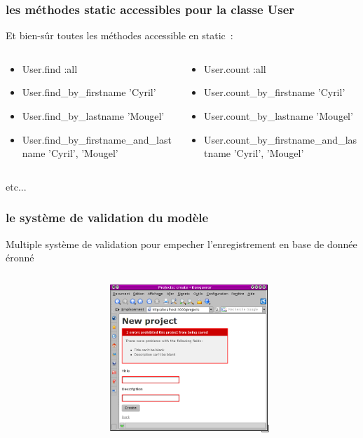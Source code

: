 \documentclass{beamer}
\begin{document}
\begin{frame}
    \frametitle{les méthodes static accessibles pour la classe User}
    Et bien-sûr toutes les méthodes accessible en static~:
    \tiny{}
    \begin{columns}
        \begin{column}[l]{6cm}
            \begin{itemize}
                \item User.find :all
                \item User.find\_by\_firstname 'Cyril'
                \item User.find\_by\_lastname 'Mougel'
                \item User.find\_by\_firstname\_and\_lastname 'Cyril', 'Mougel'
            \end{itemize}
        \end{column}

        \begin{column}[r]{6cm}
            \begin{itemize}
                \item User.count :all
                \item User.count\_by\_firstname 'Cyril'
                \item User.count\_by\_lastname 'Mougel'
                \item User.count\_by\_firstname\_and\_lastname 'Cyril', 'Mougel'
            \end{itemize}
        \end{column}
    \end{columns}
    \normalsize{}
    etc...
\end{frame}

\begin{frame}
    \frametitle{le système de validation du modèle}
    Multiple système de validation pour empecher l'enregistrement en base de
    donnée éronné
    \scriptsize{}
    \begin{columns}
        \begin{column}[l]{5cm}
            
        \end{column}

        \begin{column}[r]{5cm}
            \includegraphics[width=60mm]{error_screenshot.png}
        \end{column}
    \end{columns}
\end{frame}
\end{document}
